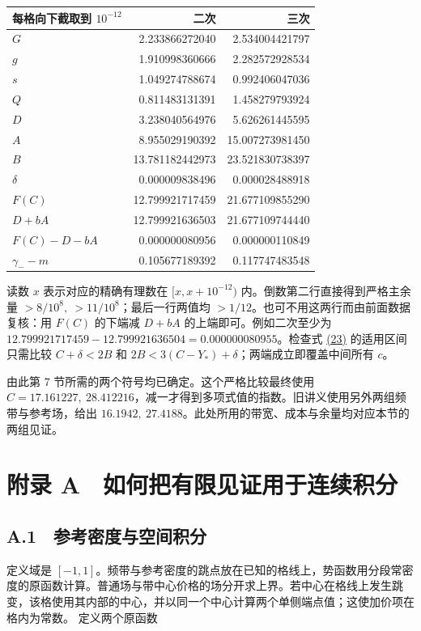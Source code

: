 \documentclass[11pt,a4paper]{article}
\begin{document}
\begin{center}\begin{tabular}{@{}lrr@{}}\toprule
每格向下截取到 \(10^{-12}\) & 二次 & 三次\\\midrule
\(G\) & 2.233866272040 & 2.534004421797 \\
\(g\) & 1.910998360666 & 2.282572928534 \\
\(s\) & 1.049274788674 & 0.992406047036 \\
\(Q\) & 0.811483131391 & 1.458279793924 \\
\(D\) & 3.238040564976 & 5.626261445595 \\
\(A\) & 8.955029190392 & 15.007273981450 \\
\(B\) & 13.781182442973 & 23.521830738397 \\
\(\delta\) & 0.000009838496 & 0.000028488918 \\
\(F(C)\) & 12.799921717459 & 21.677109855290 \\
\(D+bA\) & 12.799921636503 & 21.677109744440 \\
\(F(C)-D-bA\) & 0.000000080956 & 0.000000110849 \\
\(\gamma_- -m\) & 0.105677189392 & 0.117747483548 \\
\bottomrule\end{tabular}\end{center}
读数 \(x\) 表示对应的精确有理数在 \([x,x+10^{-12})\) 内。倒数第二行直接得到严格主余量 \(>8/10^8,\ >11/10^8\)；最后一行两值均 \(>1/12\)。也可不用这两行而由前面数据复核：用 \(F(C)\) 的下端减 \(D+bA\) 的上端即可。例如二次至少为 \(12.799921717459-12.799921636504=0.000000080955\)。检查式 \hyperref[eq:23]{(23)} 的适用区间只需比较 \(C+\delta<2B\) 和 \(2B<3(C-Y_*)+\delta\)；两端成立即覆盖中间所有 \(c\)。

由此第 7 节所需的两个符号均已确定。这个严格比较最终使用 \(C=17.161227,\ 28.412216\)，减一才得到多项式值的指数。旧讲义使用另外两组频带与参考场，给出 \(16.1942,\ 27.4188\)。此处所用的带宽、成本与余量均对应本节的两组见证。


\section{附录 A　如何把有限见证用于连续积分}
\subsection{A.1　参考密度与空间积分}
定义域是 \([-1,1]\)。频带与参考密度的跳点放在已知的格线上，势函数用分段常密度的原函数计算。普通场与带中心价格的场分开求上界。若中心在格线上发生跳变，该格使用其内部的中心，并以同一个中心计算两个单侧端点值；这使加价项在格内为常数。
定义两个原函数
\end{document}
